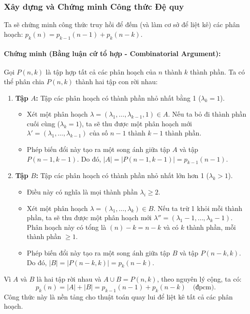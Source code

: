 \documentclass[a4paper,12pt]{article}
\begin{document}
\subsubsection{Xây dựng và Chứng minh Công thức Đệ quy}
Ta sẽ chứng minh công thức truy hồi để đếm (và làm cơ sở để liệt kê) các phân hoạch: $p_k(n) = p_{k-1}(n-1) + p_k(n-k)$.

\paragraph{Chứng minh (Bằng luận cứ tổ hợp - Combinatorial Argument):}
Gọi $P(n, k)$ là tập hợp tất cả các phân hoạch của $n$ thành $k$ thành phần. Ta có thể phân chia $P(n, k)$ thành hai tập con rời nhau:
\begin{enumerate}
    \item \textbf{Tập $A$:} Tập các phân hoạch có thành phần nhỏ nhất bằng 1 ($\lambda_k = 1$).
    \begin{itemize}
        \item Xét một phân hoạch $\lambda = (\lambda_1, \dots, \lambda_{k-1}, 1) \in A$. Nếu ta bỏ đi thành phần cuối cùng ($\lambda_k=1$), ta sẽ thu được một phân hoạch mới $\lambda' = (\lambda_1, \dots, \lambda_{k-1})$ của số $n-1$ thành $k-1$ thành phần.
        \item Phép biến đổi này tạo ra một song ánh giữa tập $A$ và tập $P(n-1, k-1)$. Do đó, $|A| = |P(n-1, k-1)| = p_{k-1}(n-1)$.
    \end{itemize}
    \item \textbf{Tập $B$:} Tập các phân hoạch có thành phần nhỏ nhất lớn hơn 1 ($\lambda_k > 1$).
    \begin{itemize}
        \item Điều này có nghĩa là mọi thành phần $\lambda_i \ge 2$.
        \item Xét một phân hoạch $\lambda = (\lambda_1, \dots, \lambda_k) \in B$. Nếu ta trừ 1 khỏi mỗi thành phần, ta sẽ thu được một phân hoạch mới $\lambda'' = (\lambda_1-1, \dots, \lambda_k-1)$. Phân hoạch này có tổng là $(n) - k = n-k$ và có $k$ thành phần, mỗi thành phần $\ge 1$.
        \item Phép biến đổi này tạo ra một song ánh giữa tập $B$ và tập $P(n-k, k)$. Do đó, $|B| = |P(n-k, k)| = p_k(n-k)$.
    \end{itemize}
\end{enumerate}
Vì $A$ và $B$ là hai tập rời nhau và $A \cup B = P(n, k)$, theo nguyên lý cộng, ta có:
\[ p_k(n) = |A| + |B| = p_{k-1}(n-1) + p_k(n-k) \quad \text{(đpcm).} \]
Công thức này là nền tảng cho thuật toán quay lui để liệt kê tất cả các phân hoạch.
\end{document}
